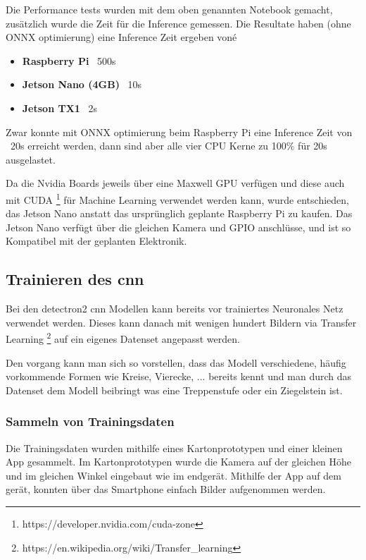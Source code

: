 
Die Performance tests wurden mit dem oben genannten Notebook gemacht, zusätzlich wurde die Zeit für die
Inference gemessen. Die Resultate haben (ohne ONNX optimierung) eine Inference Zeit ergeben voné

\begin{itemize}
    \item {\bf Raspberry Pi}  ~500s
    \item {\bf Jetson Nano (4GB)} ~10s
    \item {\bf Jetson TX1} ~2s
\end{itemize}

Zwar konnte mit ONNX optimierung beim Raspberry Pi eine Inference Zeit von ~20s erreicht werden, 
dann sind aber alle vier CPU Kerne zu 100\% für 20s ausgelastet.

Da die Nvidia Boards jeweils über eine Maxwell GPU verfügen und diese auch mit CUDA \footnote{https://developer.nvidia.com/cuda-zone}
für Machine Learning verwendet werden kann, wurde entschieden, das Jetson Nano anstatt das ursprünglich geplante
Raspberry Pi zu kaufen. Das Jetson Nano verfügt über die gleichen Kamera und GPIO anschlüsse, und 
ist so Kompatibel mit der geplanten Elektronik.

\subsection{Trainieren des \acrshort{cnn}}

Bei den detectron2 \acrshort{cnn} Modellen kann bereits vor trainiertes Neuronales Netz
verwendet werden. Dieses kann danach mit wenigen hundert Bildern via Transfer Learning \footnote{https://en.wikipedia.org/wiki/Transfer\_learning}
auf ein eigenes Datenset angepasst werden.

Den vorgang kann man sich so vorstellen, dass das Modell verschiedene, häufig vorkommende Formen wie Kreise, Vierecke, ...
bereits kennt und man durch das Datenset dem Modell beibringt was eine Treppenstufe oder ein Ziegelstein ist.

\subsubsection{Sammeln von Trainingsdaten}

Die Trainingsdaten wurden mithilfe eines Kartonprototypen und einer kleinen App gesammelt.
Im Kartonprototypen wurde die Kamera auf der gleichen Höhe und im gleichen Winkel eingebaut
wie im endgerät.
Mithilfe der App auf dem gerät, konnten über das Smartphone einfach Bilder aufgenommen werden.

